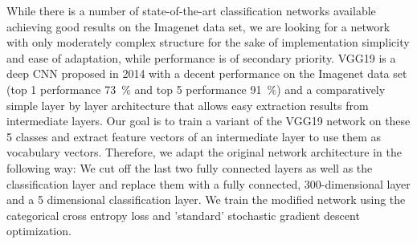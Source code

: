 While there is a number of state-of-the-art classification networks available achieving good results on the Imagenet data set, we are looking for a network with only moderately complex structure for the sake of implementation simplicity and ease of adaptation, while performance is of secondary priority.
VGG19 is a deep \acf{CNN} proposed in 2014 \cite{Simonyan2014} with a decent performance on the Imagenet data set (top 1 performance \SI{73}{\percent} and top 5 performance \SI{91}{\percent}) and a comparatively simple layer by layer architecture that allows easy extraction results from intermediate layers.
Our goal is to train a variant of the VGG19 network on these \num{5} classes and extract feature vectors of an intermediate layer to use them as vocabulary vectors.
Therefore, we adapt the original network architecture in the following way:
We cut off the last two fully connected layers as well as the classification layer and replace them with a fully connected, \num{300}-dimensional layer and a \num{5} dimensional classification layer. 
We train the modified network using the categorical cross entropy loss and 'standard' stochastic gradient descent optimization.

